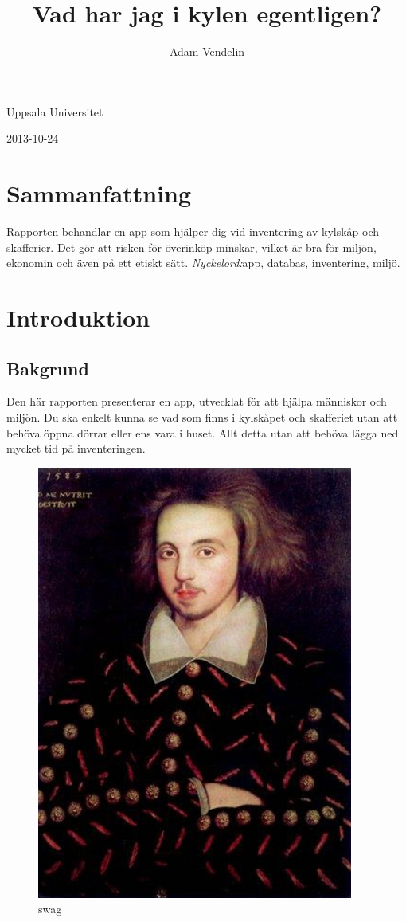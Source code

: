 \documentclass[12pt, a4paper]{article}
\title{Vad har jag i kylen egentligen?}
\author{Adam Vendelin}
\begin{document}
\maketitle
\begin{center}Uppsala Universitet 
\end{center}
\begin{center}2013-10-24
\end{center}
\pagebreak
\tableofcontents
\pagebreak

\section{Sammanfattning}
\begin{center} \parbox{12cm}{Rapporten behandlar en app som hjälper dig vid inventering av kylskåp och skafferier. Det gör att risken för överinköp minskar, vilket är bra för miljön, ekonomin och även på ett etiskt sätt.  \newline \newline \textit{Nyckelord:}app, databas, inventering, miljö.}
\end{center}
\pagebreak



\section{Introduktion}
\subsection{Bakgrund}
Den här rapporten presenterar en app, utvecklat för att hjälpa människor och miljön. Du ska enkelt kunna se vad som finns i kylskåpet och skafferiet utan att behöva öppna dörrar eller ens vara i huset. Allt detta utan att behöva lägga ned mycket tid på inventeringen. 

\begin{figure}[h!]
\includegraphics[height = 5 cm]{Marlowe.png}
\caption{swag}
\end{figure}
\end{document}
